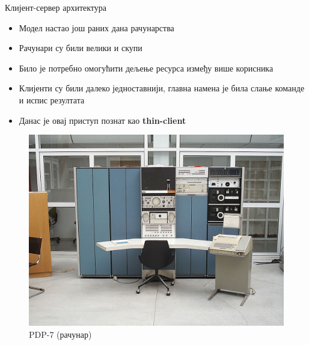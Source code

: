 \documentclass{beamer}
\begin{document}
    \begin{frame}[allowframebreaks]{Клијент-сервер архитектура}
        \begin{itemize}
            \item Модел настао још раних дана рачунарства
            \item Рачунари су били велики и скупи
            \item Било је потребно омогућити дељење ресурса између више корисника
            \item Клијенти су били далеко једноставнији, главна намена је била слање команде и испис резултата
            \item Данас је овај приступ познат као \textbf{thin-client}
        \end{itemize}
        
        \framebreak
        
        \begin{figure}
            \centering
            \includegraphics[width=\textwidth,height=0.7\textheight,keepaspectratio]{images/pdp7.jpeg}
            \caption{PDP-7 (рачунар)}
            \label{fig:mainframe}
        \end{figure}
        
        \framebreak
        

\end{frame}
\end{document}
